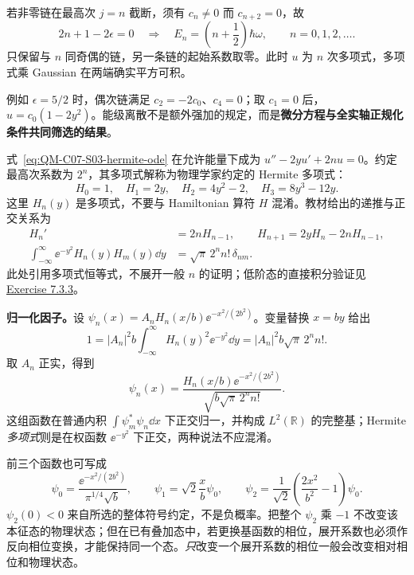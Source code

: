 若非零链在最高次 $j=n$ 截断，须有 $c_n\ne0$ 而 $c_{n+2}=0$，故
\begin{equation}
  2n+1-2\epsilon=0
  \quad\Longrightarrow\quad
  \boxed{E_n=\left(n+\frac12\right)\hbar\omega},
  \qquad n=0,1,2,\ldots.
  \label{eq:QM-C07-S03-spectrum}
\end{equation}
只保留与 $n$ 同奇偶的链，另一条链的起始系数取零。此时 $u$ 为 $n$ 次多项式，多项式乘 Gaussian 在两端确实平方可积。

例如 $\epsilon=5/2$ 时，偶次链满足 $c_2=-2c_0$、$c_4=0$；取 $c_1=0$ 后，$u=c_0(1-2y^2)$。能级离散不是额外强加的规定，而是\textbf{微分方程与全实轴正规化条件共同筛选的结果}。

式~\eqref{eq:QM-C07-S03-hermite-ode} 在允许能量下成为
$u''-2yu'+2nu=0$。约定最高次系数为 $2^n$，其多项式解称为物理学家约定的 Hermite 多项式：
\begin{equation}
  H_0=1,\quad H_1=2y,\quad H_2=4y^2-2,\quad H_3=8y^3-12y.
\end{equation}
这里 $H_n(y)$ 是多项式，不要与 Hamiltonian 算符 $H$ 混淆。教材给出的递推与正交关系为
\begin{align}
  H_n'&=2nH_{n-1},\qquad H_{n+1}=2yH_n-2nH_{n-1},\\
  \int_{-\infty}^{\infty}\ee^{-y^2}H_n(y)H_m(y)\dd y
    &=\sqrt\pi\,2^n n!\,\delta_{nm}.
  \label{eq:QM-C07-S03-hermite-orthogonality}
\end{align}
此处引用多项式恒等式，不展开一般 $n$ 的证明；低阶态的直接积分验证见
\hyperref[exercise:QM-C07-S03-E03]{Exercise 7.3.3}。

\textbf{归一化因子。}设 $\psi_n(x)=A_nH_n(x/b)\ee^{-x^2/(2b^2)}$。变量替换 $x=by$ 给出
\begin{equation}
  1=|A_n|^2b\int_{-\infty}^{\infty}H_n(y)^2\ee^{-y^2}\dd y
   =|A_n|^2b\sqrt\pi\,2^n n!.
\end{equation}
取 $A_n$ 正实，得到
\begin{equation}
  \boxed{\psi_n(x)=\frac{H_n(x/b)\ee^{-x^2/(2b^2)}}
     {\sqrt{b\sqrt\pi\,2^n n!}}}.
  \label{eq:QM-C07-S03-eigenfunctions}
\end{equation}
这组函数在普通内积 $\int\psi_m^*\psi_n\dd x$ 下正交归一，并构成 $L^2(\mathbb R)$ 的完整基；Hermite \emph{多项式}则是在权函数 $\ee^{-y^2}$ 下正交，两种说法不应混淆。

前三个函数也可写成
\begin{equation}
  \psi_0=\frac{\ee^{-x^2/(2b^2)}}{\pi^{1/4}\sqrt b},\qquad
  \psi_1=\sqrt2\frac xb\psi_0,\qquad
  \psi_2=\frac1{\sqrt2}\left(\frac{2x^2}{b^2}-1\right)\psi_0.
\end{equation}
$\psi_2(0)<0$ 来自所选的整体符号约定，不是负概率。把整个 $\psi_2$ 乘 $-1$ 不改变该本征态的物理状态；但在已有叠加态中，若更换基函数的相位，展开系数也必须作反向相位变换，才能保持同一个态。\emph{只}改变一个展开系数的相位一般会改变相对相位和物理状态。

